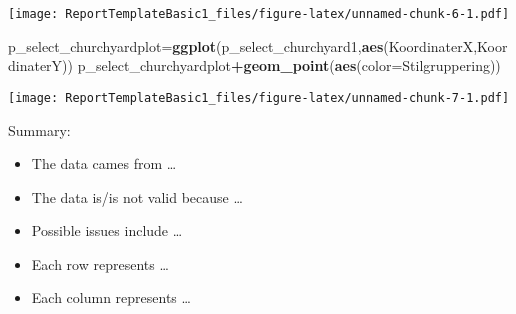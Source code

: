 \documentclass[]{article}
\newenvironment{Shaded}{\begin{snugshade}}{\end{snugshade}}
\newcommand{\DataTypeTok}[1]{\textcolor[rgb]{0.13,0.29,0.53}{#1}}
\newcommand{\KeywordTok}[1]{\textcolor[rgb]{0.13,0.29,0.53}{\textbf{#1}}}
\newcommand{\NormalTok}[1]{#1}
\newcommand{\OperatorTok}[1]{\textcolor[rgb]{0.81,0.36,0.00}{\textbf{#1}}}
\newcommand{\StringTok}[1]{\textcolor[rgb]{0.31,0.60,0.02}{#1}}
\providecommand{\tightlist}{%
  \setlength{\itemsep}{0pt}\setlength{\parskip}{0pt}}
\begin{document}
\begin{Shaded}
\end{Shaded}

\texttt{[image: ReportTemplateBasic1\_files/figure-latex/unnamed-chunk-6-1.pdf]}

\begin{Shaded}
\begin{Highlighting}[]
\NormalTok{p_select_churchyardplot=}\KeywordTok{ggplot}\NormalTok{(p_select_churchyard1,}\KeywordTok{aes}\NormalTok{(KoordinaterX,KoordinaterY))}
\NormalTok{p_select_churchyardplot}\OperatorTok{+}\KeywordTok{geom_point}\NormalTok{(}\KeywordTok{aes}\NormalTok{(}\DataTypeTok{color=}\NormalTok{Stilgruppering))}
\end{Highlighting}
\end{Shaded}

\texttt{[image: ReportTemplateBasic1\_files/figure-latex/unnamed-chunk-7-1.pdf]}

Summary:

\begin{itemize}
\tightlist
\item
  The data cames from \ldots{}
\item
  The data is/is not valid because \ldots{}
\item
  Possible issues include \ldots{}
\item
  Each row represents \ldots{}
\item
  Each column represents \ldots{}
\end{itemize}
\end{document}

